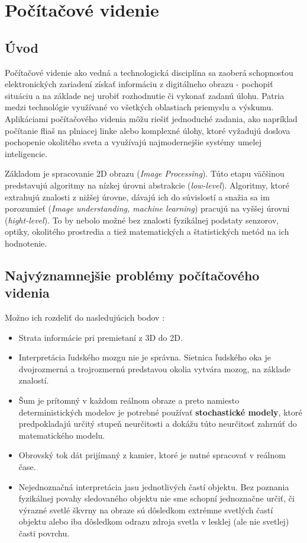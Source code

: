 \renewcommand{\theequation}{}
\setcounter{equation}{22}
\renewcommand{\theequation}{\thesection{}.\arabic{equation}}



\chapter{Počítačové videnie}
\section{Úvod}

Počítačové videnie ako vedná a technologická disciplína sa zaoberá schopnosťou elektronických zariadení získať informáciu z digitálneho obrazu - pochopiť situáciu a na základe nej urobiť rozhodnutie či vykonať zadanú úlohu. Patria medzi technológie využívané vo všetkých oblastiach priemyslu a výskumu. Aplikáciami počítačového videnia môžu riešiť jednoduché zadania, ako napríklad počítanie fliaš na plniacej linke alebo komplexné úlohy, ktoré vyžadujú doslova pochopenie okolitého sveta a využívajú najmodernejšie systémy umelej inteligencie. \cite{pocitacove_videnie_v_praxi}

Základom je spracovanie 2D obrazu (\textit{Image Processing}). Túto etapu väčšinou predstavujú algoritmy na nízkej úrovni abstrakcie (\textit{low-level}). Algoritmy, ktoré extrahujú znalosti z nižšej úrovne, dávajú ich do súvislostí a snažia sa im porozumieť (\textit{Image understanding, machine learning}) pracujú na vyššej úrovni (\textit{hight-level}). To by nebolo možné bez znalosti fyzikálnej podstaty senzorov, optiky, okolitého prostredia a tiež matematických a štatistických metód na ich hodnotenie. \cite{pocitacove_videnie_v_praxi} 


\section{Najvýznamnejšie problémy počítačového videnia }
Možno ich rozdeliť do nasledujúcich bodov \cite{Analysis_and_Machine_Vision}:
\begin{itemize}
\item Strata informácie pri premietaní z 3D do 2D. 
\item Interpretácia ľudského mozgu nie je správna. Sietnica ľudského oka je dvojrozmerná a trojrozmernú predstavou okolia vytvára mozog, na základe znalostí.
\item Šum je prítomný v každom reálnom obraze a preto namiesto deterministických modelov je potrebné používať \textbf{stochastické modely}, ktoré predpokladajú určitý stupeň neurčitosti a dokážu túto neurčitosť zahrnúť do matematického modelu.
\item Obrovský tok dát prijímaný z kamier, ktoré je nutné spracovať v reálnom čase.
\item Nejednoznačná interpretácia jasu jednotlivých častí objektu. Bez poznania fyzikálnej povahy sledovaného objektu nie sme schopní jednoznačne určiť, či výrazné svetlé škvrny na obraze sú dôsledkom extrémne svetlých častí objektu alebo iba dôsledkom odrazu zdroja svetla v lesklej (ale nie svetlej) časti povrchu.
\end{itemize}


